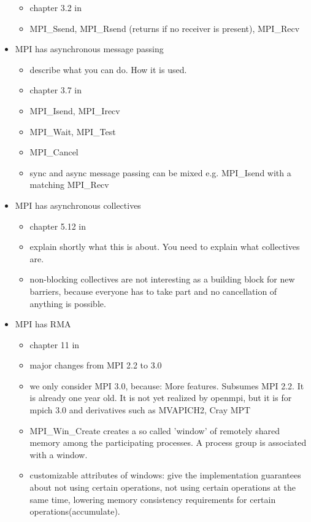 \documentclass[a4paper, 10pt]{article}
\begin{document}
\begin{itemize}
\begin{itemize}
			\item chapter 3.2 in \cite{mpi3}
			\item MPI\_Ssend, MPI\_Rsend (returns if no receiver is present), MPI\_Recv
		\end{itemize}
	\item MPI has asynchronous message passing
		\begin{itemize}
			\item describe what you can do. How it is used.
			\item chapter 3.7 in \cite{mpi3}
			\item MPI\_Isend, MPI\_Irecv
			\item MPI\_Wait, MPI\_Test
			\item MPI\_Cancel
			\item sync and async message passing can be mixed e.g. MPI\_Isend with a matching MPI\_Recv
		\end{itemize}
	\item MPI has asynchronous collectives
		\begin{itemize}
			\item chapter 5.12 in \cite{mpi3}
			\item explain shortly what this is about. You need to explain what collectives are.
			\item non-blocking collectives are not interesting as a building block for new barriers, because everyone has to take part and no cancellation of anything is possible.
		\end{itemize}
	\item MPI has RMA
		\begin{itemize}
			\item chapter 11 in \cite{mpi3}
			\item major changes from MPI 2.2\cite{mpi2} to 3.0\cite{mpi3onesided}
			\item we only consider MPI 3.0, because: More features. Subsumes MPI 2.2. It is already one year old. It is not yet realized by openmpi, but it is for mpich 3.0 and derivatives such as MVAPICH2\cite{mvapich}, Cray MPT\cite{craympt}
			\item MPI\_Win\_Create creates a so called 'window' of remotely shared memory among the participating processes. A process group is associated with a window.
			\item customizable attributes of windows: give the implementation guarantees about not using certain operations, not using certain operations at the same time, lowering memory consistency requirements for certain operations(accumulate).

\end{itemize}
\end{itemize}
\end{document}
